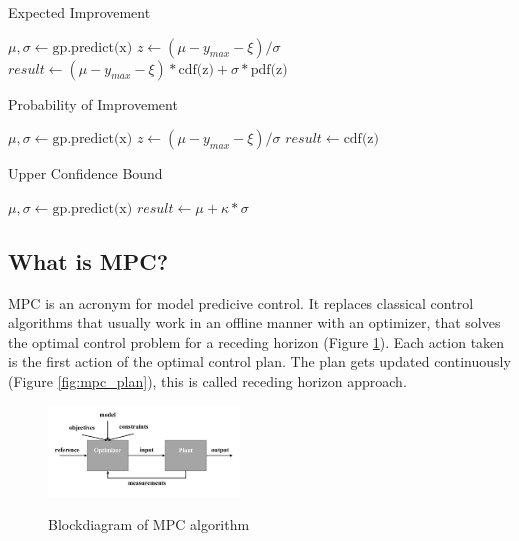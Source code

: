 \documentclass[twoside,twocolumn]{article}
\begin{document}
\begin{algorithm}
    \caption{Expected Improvement}
    \label{alg:ei}
    \begin{algorithmic}
        \State $\mu, \sigma \gets \text{gp.predict(x)}$
        \State $z \gets (\mu - y_{max} - \xi)/\sigma$
        \State $result \gets (\mu - y_{max} - \xi) * \text{cdf(z)} + \sigma * \text{pdf(z)}$
    \end{algorithmic}
\end{algorithm}

\begin{algorithm}
    \caption{Probability of Improvement}
    \label{alg:poi}
    \begin{algorithmic}
        \State $\mu, \sigma \gets \text{gp.predict(x)}$
        \State $z \gets (\mu - y_{max} - \xi)/\sigma$
        \State $result \gets \text{cdf(z)}$
    \end{algorithmic}
\end{algorithm}

\begin{algorithm}
    \caption{Upper Confidence Bound}
    \label{alg:ucb}
    \begin{algorithmic}
        \State $\mu, \sigma \gets \text{gp.predict(x)}$
        \State $result \gets \mu + \kappa * \sigma$
    \end{algorithmic}
\end{algorithm}

\subsection{What is MPC?}
MPC is an acronym for model predicive control.
It replaces classical control algorithms that usually work in an offline manner with an optimizer, that solves the optimal control problem for a receding horizon (Figure \ref{fig:mpc}).
Each action taken is the first action of the optimal control plan.
The plan gets updated continuously (Figure \ref{fig:mpc_plan}), this is called receding horizon approach.

\begin{figure}[h]
    \caption{Blockdiagram of MPC algorithm}
    \centering
    \includegraphics[width=0.45\textwidth]{fig_mpc.pdf}
    \label{fig:mpc}
\end{figure}
\end{document}
